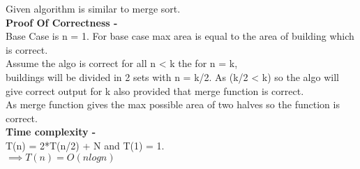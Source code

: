 \documentclass[a4paper,11pt]{article}
\theoremstyle{mytheor}
\begin{document}
Given algorithm is similar to merge sort.\\
\textbf{Proof Of Correctness -}\\
Base Case is n = 1. For base case max area is equal to the area of building which is correct.\\
Assume the algo is correct for all n < k the for n = k,\\
buildings will be divided in 2 sets with n = k/2. As (k/2 < k) so the algo will give correct output for k also provided that merge function is correct.\\
As merge function gives the max possible area of two halves so the function is correct.\\
\textbf{Time complexity -}\\
T(n) = 2*T(n/2) + N and T(1) = 1.\\
$\implies T(n) = O(nlogn)$\\
\end{document}
